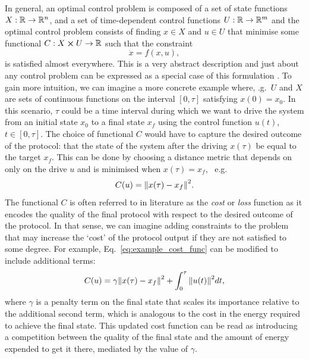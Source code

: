 In general, an optimal control problem is composed of a set of state functions $X: \mathbb{R} \rightarrow \mathbb{R}^n$, and a set of time-dependent control functions $U:\mathbb{R} \rightarrow \mathbb{R}^m$ and the optimal control problem consists of finding $x \in X$ and $u \in U$ that minimise some functional $C: X \cross U \rightarrow \mathbb{R}$ such that the constraint
\begin{equation}\label{eq:control_ODE}
    \dot{x} = f(x, u),
\end{equation}
is satisfied almost everywhere. This is a very abstract description and just about any control problem can be expressed as a special case of this formulation \cite{dalessandro_introduction_2021}. To gain more intuition, we can imagine a more concrete example where, \@e.g.~$U$ and $X$ are sets of continuous functions on the interval $[0, \tau]$ satisfying $x(0) = x_0$. In this scenario, $\tau$ could be a time interval during which we want to drive the system from an initial state $x_0$ to a final state $x_f$ using the control function $u(t)$, $t \in [0, \tau]$. The choice of functional $C$ would have to capture the desired outcome of the protocol: that the state of the system after the driving $x(\tau)$ be equal to the target $x_f$. This can be done by choosing a distance metric that depends on only on the drive $u$ and is minimised when $x(\tau) = x_f$, \@~e.g.
\begin{equation}\label{eq:example_cost_func}
    C(u) = \norm{x(\tau)  - x_f}^2.
\end{equation}
The functional $C$ is often referred to in literature as the \emph{cost} or \emph{loss} function \cite{wald_statistical_1950} as it encodes the quality of the final protocol with respect to the desired outcome of the protocol. In that sense, we can imagine adding constraints to the problem that may increase the `cost' of the protocol output if they are not satisfied to some degree. For example, Eq.~\eqref{eq:example_cost_func} can be modified to include additional terms:
\begin{equation}\label{eq:example_cost_func2}
    C(u) = \gamma \norm{x(\tau)  - x_f}^2 + \int_0^{\tau} \norm{u(t)}^2 dt,
\end{equation}
where $\gamma$ is a penalty term on the final state that scales its importance relative to the additional second term, which is analogous to the cost in the energy required to achieve the final state. This updated cost function can be read as introducing a competition between the quality of the final state and the amount of energy expended to get it there, mediated by the value of $\gamma$. 

